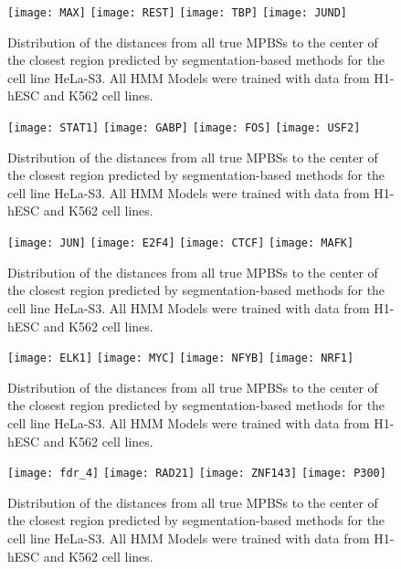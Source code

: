 \documentclass[11pt,a4]{article}
\begin{document}
\begin{figure}[h]
\centering
    \texttt{[image: MAX]}
    \texttt{[image: REST]}
    \texttt{[image: TBP]}
    \texttt{[image: JUND]}
\caption{Distribution of the distances from all true MPBSs to the center of the closest region predicted by segmentation-based methods for the cell line HeLa-S3. All HMM Models were trained with data from H1-hESC and K562 cell lines.}
\label{fig:boxplot.HeLaS3.fdr_4.1}
\end{figure}

\begin{figure}[h]
\centering
    \texttt{[image: STAT1]}
    \texttt{[image: GABP]}
    \texttt{[image: FOS]}
    \texttt{[image: USF2]}
\caption{Distribution of the distances from all true MPBSs to the center of the closest region predicted by segmentation-based methods for the cell line HeLa-S3. All HMM Models were trained with data from H1-hESC and K562 cell lines.}
\label{fig:boxplot.HeLaS3.fdr_4.2}
\end{figure}

\begin{figure}[h]
\centering
    \texttt{[image: JUN]}
    \texttt{[image: E2F4]}
    \texttt{[image: CTCF]}
    \texttt{[image: MAFK]}
\caption{Distribution of the distances from all true MPBSs to the center of the closest region predicted by segmentation-based methods for the cell line HeLa-S3. All HMM Models were trained with data from H1-hESC and K562 cell lines.}
\label{fig:boxplot.HeLaS3.fdr_4.3}
\end{figure}

\begin{figure}[h]
\centering
    \texttt{[image: ELK1]}
    \texttt{[image: MYC]}
    \texttt{[image: NFYB]}
    \texttt{[image: NRF1]}
\caption{Distribution of the distances from all true MPBSs to the center of the closest region predicted by segmentation-based methods for the cell line HeLa-S3. All HMM Models were trained with data from H1-hESC and K562 cell lines.}
\label{fig:boxplot.HeLaS3.fdr_4.4}
\end{figure}

\begin{figure}[h]
\centering
    \texttt{[image: fdr\_4]}
    \texttt{[image: RAD21]}
    \texttt{[image: ZNF143]}
    \texttt{[image: P300]}
\caption{Distribution of the distances from all true MPBSs to the center of the closest region predicted by segmentation-based methods for the cell line HeLa-S3. All HMM Models were trained with data from H1-hESC and K562 cell lines.}
\label{fig:boxplot.HeLaS3.fdr_4.5}
\end{figure}
\end{document}

